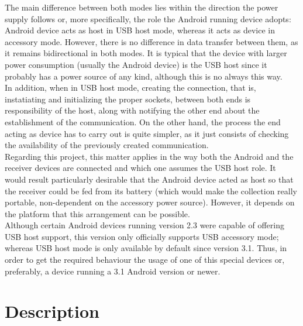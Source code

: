 			The main difference between both modes lies within the direction the power supply follows or, more
			specifically, the role the Android running device adopts: Android device acts as host in USB host
			mode, whereas it acts as device in accessory mode. However, there is no difference in data transfer
			between them, as it remains bidirectional in both modes. It is typical that the device with larger
			power consumption (usually the Android device) is the USB host since it probably has a power source
			of any kind, although this is no always this way.\\

			In addition, when in USB host mode, creating the connection, that is, instatiating and initializing
			the proper sockets, between both ends is responsibility of the host, along with notifying the other
			end about the establishment of the communication. On the other hand, the process the end acting as
			device has to carry out is quite simpler, as it just consists of checking the availability of the
			previously created communication.\\

			Regarding this project, this matter applies in the way both the Android and the receiver devices are
			connected and which one assumes the USB host role. It would result particularly desirable that the
			Android device acted as host so that the receiver could be fed from its battery (which would make the
			collection really portable, non-dependent on the accessory power source). However, it depends on
			the platform that this arrangement can be possible.\\

			Although certain Android devices running version 2.3 were capable of offering USB host support, this
			version only officially supports USB accessory mode; whereas USB host mode is only available by
			default since version 3.1. Thus, in order to get the required behaviour the usage of one of this
			special devices or, preferably, a device running a 3.1 Android version or newer.

	\section{Description}
	\label{sec:hw-descr}



